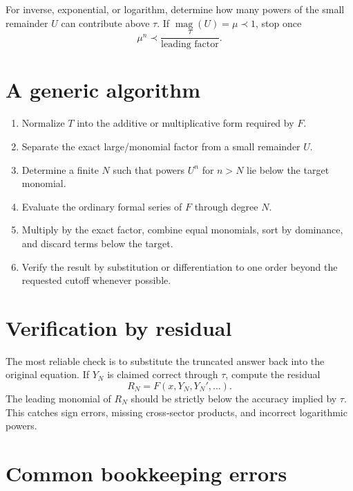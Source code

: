 \documentclass[11pt,oneside]{book}
\theoremstyle{definition}
\theoremstyle{remark}
\newcommand{\magop}{\operatorname{mag}}
\newcommand{\precdom}{\prec}
\begin{document}
For inverse, exponential, or logarithm, determine how many powers of the small
remainder $U$ can contribute above $\tau$. If $\magop(U)=\mu\precdom1$, stop once
\[
  \mu^n\precdom \frac{\tau}{\text{leading factor}}.
\]

\section{A generic algorithm}

\begin{tcolorbox}[enhanced,breakable,colback=softgray,colframe=black!65,
 title=Truncated unary operation $F(T)$]
\begin{enumerate}
\item Normalize $T$ into the additive or multiplicative form required by $F$.
\item Separate the exact large/monomial factor from a small remainder $U$.
\item Determine a finite $N$ such that powers $U^n$ for $n>N$ lie below the
      target monomial.
\item Evaluate the ordinary formal series of $F$ through degree $N$.
\item Multiply by the exact factor, combine equal monomials, sort by dominance,
      and discard terms below the target.
\item Verify the result by substitution or differentiation to one order beyond
      the requested cutoff whenever possible.
\end{enumerate}
\end{tcolorbox}

\section{Verification by residual}

The most reliable check is to substitute the truncated answer back into the
original equation. If $Y_N$ is claimed correct through $\tau$, compute the
residual
\[
  R_N=F(x,Y_N,Y_N',\ldots).
\]
The leading monomial of $R_N$ should be strictly below the accuracy implied by
$\tau$. This catches sign errors, missing cross-sector products, and incorrect
logarithmic powers.

\section{Common bookkeeping errors}
\end{document}
